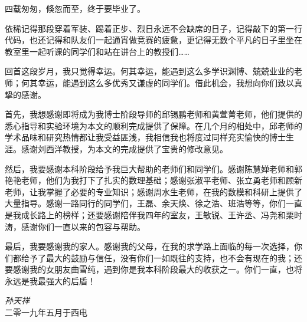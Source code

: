
\begin{acknowledgments}

四载匆匆，倏忽而至，终于要毕业了。

依稀记得那段穿着军装、踢着正步、烈日永远不会缺席的日子，记得敲下的第一行代码，也还记得和队友们一起通宵做竞赛的疲惫，更记得无数个平凡的日子里坐在教室里一起听课的同学们和站在讲台上的教授们……

回首这段岁月，我只觉得幸运。何其幸运，能遇到这么多学识渊博、兢兢业业的老师；何其幸运，能遇到这么多优秀又谦虚的同学们。借此机会，我想向你们致以真挚的感谢。

首先，我想感谢即将成为我博士阶段导师的邱锡鹏老师和黄萱菁老师，他们提供的悉心指导和实验环境为本文的顺利完成提供了保障。在几个月的相处中，邱老师的学术品味和研究热情都让我受益匪浅，我相信我也将度过同样充实愉快的博士生涯。感谢刘西洋教授，为本文的完成提供了宝贵的修改意见。

然后，我要感谢本科阶段给予我巨大帮助的老师们和同学们。感谢陈慧婵老师和郭艳艳老师，他们为我打下了扎实的数理基础；感谢张淑平老师、张立勇老师和顾新老师，让我掌握了必要的专业知识；感谢周水生老师，在我的数模和科研上提供了大量指导。感谢一路同行的同学们，王磊、余天焕、徐之浩、班浩等等，你们一直是我成长路上的榜样；还要感谢陪伴我四年的室友，王敏锐、王许丞、冯尧和栗时涛，感谢你们一直以来的包容与帮助。

最后，我要感谢我的家人。感谢我的父母，在我的求学路上面临的每一次选择，你们都给予了最大的鼓励与信任，没有你们一如既往的支持，也不会有现在的我；还要感谢我的女朋友曲雪纯，遇到你是我本科阶段最大的收获之一。你们一直，也将永远是我最强大的后盾！

\begin{flushright}
	\emph{孙天祥}\\
	二零一九年五月于西电
\end{flushright}

\end{acknowledgments}

